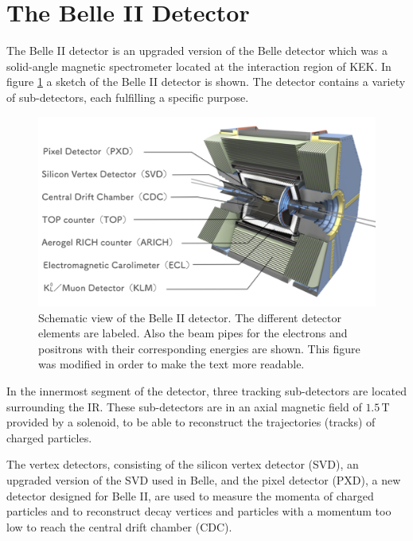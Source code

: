 \documentclass[a4paper,11pt,twosided,final,german,openbib,pdftex,listof=totoc,bibliography=totoc]{scrbook}
\begin{document}
\section{The Belle II Detector}
\label{sec:Belle II}

The Belle II detector is an upgraded version of the Belle detector which was a solid-angle magnetic spectrometer located at the interaction region of KEK. In figure \ref{fig:Belle2} a sketch of the Belle II detector is shown. The detector contains a variety of sub-detectors, each fulfilling a specific purpose.
 
\begin{figure}[h!]
	\centering
	\includegraphics[width=\textwidth]{Bilder/Belle2.pdf}
	
	\caption[Belle II Detector]{Schematic view of the Belle II detector. The different detector elements are labeled. Also the beam pipes for the electrons and positrons with their corresponding energies are shown. \cite{BDetector} This figure was modified in order to make the text more readable.}
	\label{fig:Belle2}
\end{figure}

 In the innermost segment of the detector, three tracking sub-detectors are located surrounding the IR. These sub-detectors are in an axial magnetic field of $1.5\,\textrm{T}$ provided by a solenoid, to be able to reconstruct the trajectories (tracks) of charged particles. 
 
 The vertex detectors, consisting of the silicon vertex detector (SVD), an upgraded version of the SVD used in Belle, and the pixel detector (PXD), a new detector designed for Belle II, are used to measure the momenta of charged particles and to reconstruct decay vertices and particles with a momentum too low to reach the central drift chamber (CDC).
\end{document}
